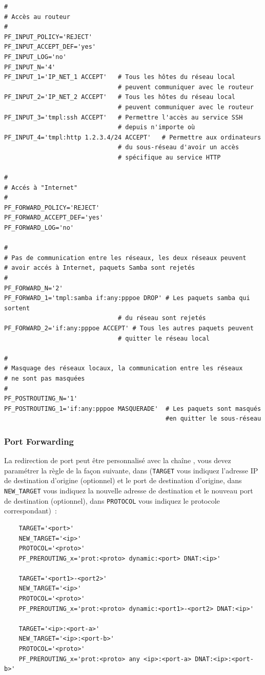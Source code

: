 \begin{example}
\begin{verbatim}
#
# Accès au routeur
#
PF_INPUT_POLICY='REJECT'
PF_INPUT_ACCEPT_DEF='yes'
PF_INPUT_LOG='no'
PF_INPUT_N='4'
PF_INPUT_1='IP_NET_1 ACCEPT'   # Tous les hôtes du réseau local
                               # peuvent communiquer avec le routeur
PF_INPUT_2='IP_NET_2 ACCEPT'   # Tous les hôtes du réseau local
                               # peuvent communiquer avec le routeur
PF_INPUT_3='tmpl:ssh ACCEPT'   # Permettre l'accès au service SSH
                               # depuis n'importe où
PF_INPUT_4='tmpl:http 1.2.3.4/24 ACCEPT'   # Permettre aux ordinateurs
                               # du sous-réseau d'avoir un accès
                               # spécifique au service HTTP

#
# Accés à "Internet"
#
PF_FORWARD_POLICY='REJECT'
PF_FORWARD_ACCEPT_DEF='yes'
PF_FORWARD_LOG='no'

#
# Pas de communication entre les réseaux, les deux réseaux peuvent
# avoir accés à Internet, paquets Samba sont rejetés
#
PF_FORWARD_N='2'
PF_FORWARD_1='tmpl:samba if:any:pppoe DROP' # Les paquets samba qui sortent
                               # du réseau sont rejetés
PF_FORWARD_2='if:any:pppoe ACCEPT' # Tous les autres paquets peuvent
                               # quitter le réseau local

#
# Masquage des réseaux locaux, la communication entre les réseaux
# ne sont pas masquées
#
PF_POSTROUTING_N='1'
PF_POSTROUTING_1='if:any:pppoe MASQUERADE'  # Les paquets sont masqués
                                            #en quitter le sous-réseau
\end{verbatim}
\end{example}

\subsubsection{Port Forwarding}

La redirection de port peut être personnalisé avec la chaîne ,
vous devez paramétrer la règle de la façon suivante, dans (\verb+TARGET+ vous
indiquez l'adresse IP de destination d'origine (optionnel) et le port de
destination d'origine, dans \verb+NEW_TARGET+ vous indiquez la nouvelle adresse
de destination et le nouveau port de destination (optionnel), dans \verb+PROTOCOL+
vous indiquez le protocole correspondant)~:

\begin{example}
\begin{verbatim}
    TARGET='<port>'
    NEW_TARGET='<ip>'
    PROTOCOL='<proto>'
    PF_PREROUTING_x='prot:<proto> dynamic:<port> DNAT:<ip>'

    TARGET='<port1>-<port2>'
    NEW_TARGET='<ip>'
    PROTOCOL='<proto>'
    PF_PREROUTING_x='prot:<proto> dynamic:<port1>-<port2> DNAT:<ip>'

    TARGET='<ip>:<port-a>'
    NEW_TARGET='<ip>:<port-b>'
    PROTOCOL='<proto>'
    PF_PREROUTING_x='prot:<proto> any <ip>:<port-a> DNAT:<ip>:<port-b>'
\end{verbatim}
\end{example}

